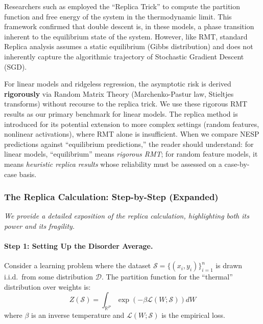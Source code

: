 \documentclass[
  journal=largetwo,
  year=2025,
  volume=37,
]{cup-journal}
\begin{document}
Researchers such as \cite{mezard1987spin, gerace2020generalisation} employed the ``Replica Trick'' to compute the partition function and free energy of the system in the thermodynamic limit. This framework confirmed that double descent is, in these models, a phase transition inherent to the equilibrium state of the system. However, like RMT, standard Replica analysis assumes a static equilibrium (Gibbs distribution) and does not inherently capture the algorithmic trajectory of Stochastic Gradient Descent (SGD).

\begin{remark}
For linear models and ridgeless regression, the asymptotic risk is derived \textbf{rigorously} via Random Matrix Theory (Marchenko-Pastur law, Stieltjes transforms) without recourse to the replica trick. We use these rigorous RMT results as our primary benchmark for linear models. The replica method is introduced for its potential extension to more complex settings (random features, nonlinear activations), where RMT alone is insufficient. When we compare NESP predictions against ``equilibrium predictions,'' the reader should understand: for linear models, ``equilibrium'' means \textit{rigorous RMT}; for random feature models, it means \textit{heuristic replica results} whose reliability must be assessed on a case-by-case basis.
\end{remark}

\subsubsection{The Replica Calculation: Step-by-Step (Expanded)}

\textit{We provide a detailed exposition of the replica calculation, highlighting both its power and its fragility.}

\paragraph{Step 1: Setting Up the Disorder Average.}

Consider a learning problem where the dataset $\mathcal{S} = \{(x_i, y_i)\}_{i=1}^n$ is drawn i.i.d.\ from some distribution $\mathcal{D}$. The partition function for the ``thermal'' distribution over weights is:
\begin{equation}
    Z(\mathcal{S}) = \int_{\mathbb{R}^P} \exp\left( -\beta \mathcal{L}(W; \mathcal{S}) \right) dW
\end{equation}
where $\beta$ is an inverse temperature and $\mathcal{L}(W; \mathcal{S})$ is the empirical loss.
\end{document}
